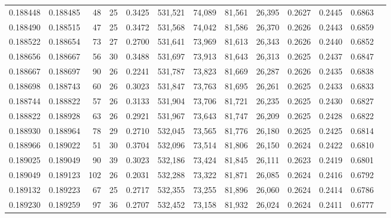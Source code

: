 \begin{tabular}{rrrrrrrrrrrrr}
0.188448 & 0.188485 &    48 &  25 &                                     0.3425 & 531,521 &  74,089 &  81,561 &  26,395 & 0.2627 & 0.2445 & 0.6863 \\
0.188490 & 0.188515 &    47 &  25 &                                     0.3472 & 531,568 &  74,042 &  81,586 &  26,370 & 0.2626 & 0.2443 & 0.6859 \\
0.188522 & 0.188654 &    73 &  27 &                                     0.2700 & 531,641 &  73,969 &  81,613 &  26,343 & 0.2626 & 0.2440 & 0.6852 \\
0.188656 & 0.188667 &    56 &  30 &                                     0.3488 & 531,697 &  73,913 &  81,643 &  26,313 & 0.2625 & 0.2437 & 0.6847 \\
0.188667 & 0.188697 &    90 &  26 &                                     0.2241 & 531,787 &  73,823 &  81,669 &  26,287 & 0.2626 & 0.2435 & 0.6838 \\
0.188698 & 0.188743 &    60 &  26 &                                     0.3023 & 531,847 &  73,763 &  81,695 &  26,261 & 0.2625 & 0.2433 & 0.6833 \\
0.188744 & 0.188822 &    57 &  26 &                                     0.3133 & 531,904 &  73,706 &  81,721 &  26,235 & 0.2625 & 0.2430 & 0.6827 \\
0.188822 & 0.188928 &    63 &  26 &                                     0.2921 & 531,967 &  73,643 &  81,747 &  26,209 & 0.2625 & 0.2428 & 0.6822 \\
0.188930 & 0.188964 &    78 &  29 &                                     0.2710 & 532,045 &  73,565 &  81,776 &  26,180 & 0.2625 & 0.2425 & 0.6814 \\
0.188966 & 0.189022 &    51 &  30 &                                     0.3704 & 532,096 &  73,514 &  81,806 &  26,150 & 0.2624 & 0.2422 & 0.6810 \\
0.189025 & 0.189049 &    90 &  39 &                                     0.3023 & 532,186 &  73,424 &  81,845 &  26,111 & 0.2623 & 0.2419 & 0.6801 \\
0.189049 & 0.189123 &   102 &  26 &                                     0.2031 & 532,288 &  73,322 &  81,871 &  26,085 & 0.2624 & 0.2416 & 0.6792 \\
0.189132 & 0.189223 &    67 &  25 &                                     0.2717 & 532,355 &  73,255 &  81,896 &  26,060 & 0.2624 & 0.2414 & 0.6786 \\
0.189230 & 0.189259 &    97 &  36 &                                     0.2707 & 532,452 &  73,158 &  81,932 &  26,024 & 0.2624 & 0.2411 & 0.6777 \\

\end{tabular}

